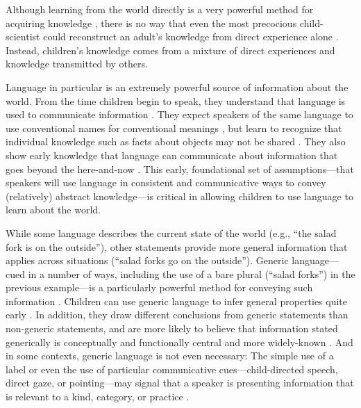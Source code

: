 \documentclass[man]{apa2}
\begin{document}
Although learning from the world directly is a very powerful method for acquiring knowledge \cite{gopnik2012b}, there is no way that even the most precocious child-scientist could reconstruct an adult's knowledge from direct experience alone \cite{shafto2012,harris2012}. Instead, children's knowledge comes from a mixture of direct experiences and knowledge transmitted by others. 

Language in particular is an extremely powerful source of information about the world. From the time children begin to speak, they understand that language is used to communicate information \cite{vouloumanos2012,martin2012}. They expect speakers of the same language to use conventional names for conventional meanings \cite{clark1987, markman1988, diesendruck2005}, but learn to recognize that individual knowledge such as facts about objects may not be shared \cite{diesendruck2001}. They also show early knowledge that language can communicate about information that goes beyond the here-and-now \cite{saylor2007,ganea2007}. This early, foundational set of assumptions---that speakers will use language in consistent and communicative ways to convey (relatively) abstract knowledge---is critical in allowing children to use language to learn about the world. 

While some language describes the current state of the world (e.g., ``the salad fork is on the outside''), other statements provide more general information that applies across situations (``salad forks go on the outside''). Generic language---cued in a number of ways, including the use of a bare plural (``salad forks'') in the previous example---is a particularly powerful method for conveying such information \cite{leslie2008}. Children can use generic language to infer general properties quite early \cite{gelman2003}. In addition, they draw different conclusions from generic statements than non-generic statements, and are more likely to believe that information stated generically is  conceptually and functionally central and more widely-known \cite{cimpian2009, cimpian2010, cimpian2012}. And in some contexts, generic language is not even necessary: The simple use of a label or even the use of particular communicative cues---child-directed speech, direct gaze, or pointing---may signal that a speaker is presenting information that is relevant to a kind, category, or practice \cite{csibra2009, butler2012}. 
\end{document}
